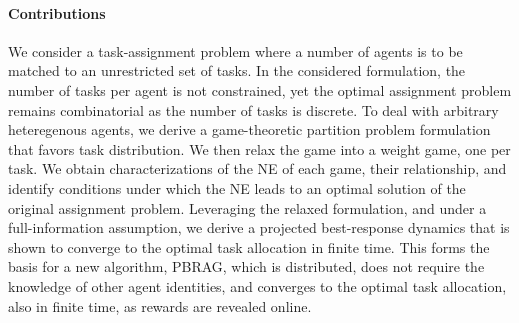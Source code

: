 \documentclass{IEEEtran}
\def \dynacr{PBRAG}
\begin{document}
\paragraph{Contributions}
We consider a task-assignment problem where a number of agents is to
be matched to an unrestricted set of tasks. In the considered
formulation, the number of tasks per agent is not constrained, yet the
optimal assignment problem remains combinatorial as the number of
tasks is discrete. To deal with arbitrary heteregenous agents, we
derive a game-theoretic partition problem formulation that favors task
distribution. We then relax the game into a weight game, one per
task. We obtain characterizations of the NE of each game, their
relationship, and identify conditions under which the NE leads to an
optimal solution of the original assignment problem. Leveraging the
relaxed formulation, and under a full-information assumption, we
derive a projected best-response dynamics that is shown to converge to
the optimal task allocation in finite time. This forms the basis for a new algorithm,
\dynacr, which is distributed, does not require the knowledge of other
agent identities, and converges to the optimal task allocation, also in finite time, as
rewards are revealed online.

\end{document}
